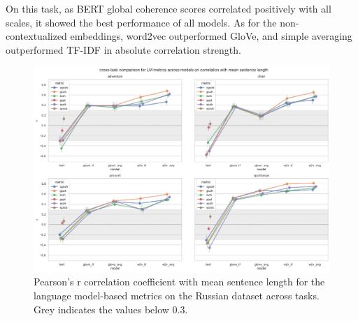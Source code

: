 On this task, as BERT global coherence scores correlated positively with all scales, it showed the best performance of all models. As for the non-contextualized embeddings, word2vec outperformed GloVe, and simple averaging outperformed TF-IDF in absolute correlation strength.




\begin{figure}[ht!]
    \includegraphics[width=1.1\textwidth, center]{Figures/chapter_4/LM/ru_corr_len.png} 
\captionsetup{width=\textwidth}
\caption[LM Metrics: Russian, Length Correlation]{\label{fig:results:lm:ru:corr_len} Pearson's r correlation coefficient with mean sentence length for the language model-based metrics on the Russian dataset across tasks. Grey indicates the values below 0.3.}
\end{figure}

